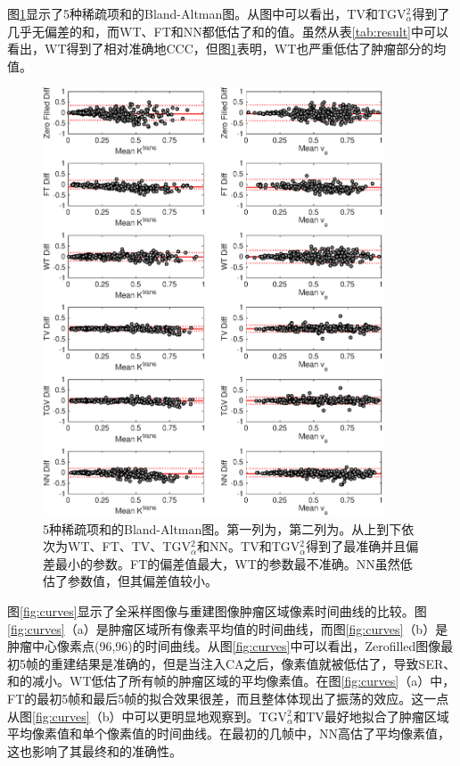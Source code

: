 图\ref{fig:baplot}显示了5种稀疏项\kt 和\Ve 的Bland-Altman图。从图中可以看出，TV和TGV$_{\alpha}^2$得到了几乎无偏差的\kt 和\Ve，而WT、FT和NN都低估了\kt 和\Ve 的值。虽然从表\ref{tab:result}中可以看出，WT得到了相对准确地CCC，但图\ref{fig:baplot}表明，WT也严重低估了肿瘤部分的均值。

\begin{figure}[htbp]
\centerline{\includegraphics[width=0.9\textwidth]{img/qetsr/figure5.eps}}
\centering
\caption{
5种稀疏项\kt 和\Ve 的Bland-Altman图。第一列为\kt，第二列为\Ve。从上到下依次为WT、FT、TV、TGV$_{\alpha}^2$和NN。TV和TGV$_{\alpha}^2$得到了最准确并且偏差最小的参数。FT的偏差值最大，WT的参数最不准确。NN虽然低估了参数值，但其偏差值较小。
}
\label{fig:baplot}
\end{figure}

图\ref{fig:curves}显示了全采样图像与重建图像肿瘤区域像素时间曲线的比较。图\ref{fig:curves}（a）是肿瘤区域所有像素平均值的时间曲线，而图\ref{fig:curves}（b）是肿瘤中心像素点(96,96)的时间曲线。从图\ref{fig:curves}中可以看出，Zerofilled图像最初5帧的重建结果是准确的，但是当注入CA之后，像素值就被低估了，导致SER、\kt 和\Ve 的减小。WT低估了所有帧的肿瘤区域的平均像素值。在图\ref{fig:curves}（a）中，FT的最初5帧和最后5帧的拟合效果很差，而且整体体现出了振荡的效应。这一点从图\ref{fig:curves}（b）中可以更明显地观察到。TGV$_{\alpha}^2$和TV最好地拟合了肿瘤区域平均像素值和单个像素值的时间曲线。在最初的几帧中，NN高估了平均像素值，这也影响了其最终\kt 和\Ve 的准确性。

